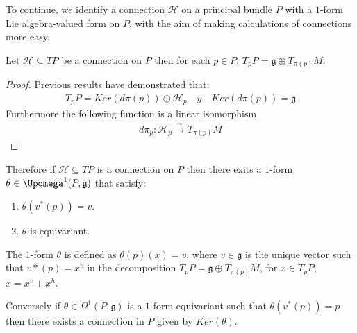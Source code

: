 To continue, we identify a connection $\mathcal{H}$ on a principal bundle $P$ with a $1$-form Lie algebra-valued form on $P$, with the aim of making calculations  of connections more easy.

\begin{theorem} 
	Let $\mathcal{H} \subseteq TP$ be a connection on $P$ then for each $p \in P$, $T_{p}P= \mathfrak{g} \oplus T_{\pi(p)}M$. 
\end{theorem}
\begin{proof}
	Previous results have demonstrated that:
	\begin{align*}
	T_{p}P=Ker(d\pi(p))\oplus \mathcal{H}_{p} \quad y \quad Ker(d\pi(p))=\mathfrak{g}
	\end{align*} 
	Furthermore the following function is a linear isomorphism
	\begin{align*}
	d\pi_{p}: \mathcal{H}_{p} \xrightarrow{\sim} T_{\pi(p)}M
	\end{align*}
\end{proof}
 Therefore if $\mathcal{H}\subseteq TP$  is a connection on $P$ then there exits a $1$-form $\theta \in \Upomega^{1}(P,\mathfrak{g})$ that satisfy:
 \begin{enumerate}[$\cdot$]
 	\item $\theta(v^{*}(p))=v$.
 	\item $\theta$ is equivariant.
 \end{enumerate}
 The $1$-form $\theta$ is defined as $\theta(p)(x)=v$, where $v \in \mathfrak{g}$ is the unique vector such that $v*(p)=x^{v}$ in the decomposition $T_{p}P= \mathfrak{g} \oplus T_{\pi(p)}M$, for $x \in T_{p}P$, $x=x^{v}+x^{h}$.

Conversely if $\theta \in \Omega^{1}(P,\mathfrak{g})$ is a $1$-form equivariant such that $\theta(v^{*}(p))=p$ then there exists a connection in $P$ given by $Ker(\theta)$.


